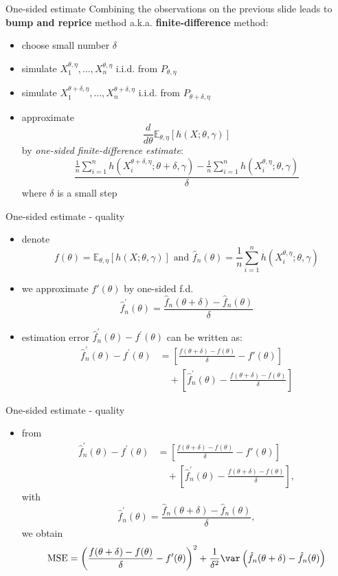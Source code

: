 \documentclass[pdf, handout]{beamer}
\begin{document}
\begin{frame}{One-sided estimate}
Combining the observations on the previous slide leads to
\textbf{bump and reprice} method a.k.a.
\textbf{finite-difference} method:
\begin{itemize}
\item choose small number $\delta$
\item simulate $X_1^{\theta,\eta},\dots,X_n^{\theta,\eta}$ i.i.d. from
$P_{\theta,\eta}$
\item simulate $X_1^{\theta+\delta,\eta},\dots,X_n^{\theta+\delta,\eta}$ i.i.d. from
$P_{\theta+\delta,\eta}$
\item approximate
\[
\frac{d}{d\theta} \mathbb{E}_{\theta,\eta} [ h(X; \theta, \gamma)]
\]
by \emph{one-sided finite-difference estimate}:
$$
\frac{\frac{1}{n}\sum_{i=1}^n h(X_i^{\theta+\delta,\eta}; \theta+\delta,\gamma) - \frac{1}{n}\sum_{i=1}^n h(X_i^{\theta,\eta}; \theta,\gamma)}{\delta}
$$
where $\delta$ is a small step
\end{itemize}
\end{frame}

\begin{frame}{One-sided estimate - quality}
\begin{itemize}
\item denote 
\[
f(\theta) = \mathbb{E}_{\theta,\eta} [ h(X; \theta, \gamma)] \text{ and } 
\hat f_n(\theta) = \frac{1}{n}\sum_{i=1}^n h(X_i^{\theta,\eta}; \theta,\gamma)
\]
\item we approximate $f'(\theta)$ by one-sided f.d.
\[
\hat{f}_n^\prime(\theta) = \frac{ \hat f_n(\theta+\delta) - \hat f_n(\theta)}{\delta}
\]
\item estimation error $\hat{f}_n^\prime(\theta) - f^\prime(\theta)$ can be written as:
\begin{align*}
\hat{f}_n^\prime(\theta) - f^\prime(\theta) &
= \left[
\frac{ f(\theta+\delta) - f(\theta)}{\delta} - f'(\theta)
\right] \\
&\quad + \left[ \hat{f}_n^\prime(\theta) - \frac{ f(\theta+\delta) - f(\theta)}{\delta} \right]
\end{align*}
\end{itemize}
\end{frame}

\begin{frame}{One-sided estimate - quality}
\begin{itemize}
\item from
\begin{align*}
\hat{f}_n^\prime(\theta) - f^\prime(\theta) &
= \left[
\frac{ f(\theta+\delta) - f(\theta)}{\delta} - f'(\theta)
\right] \\
&\quad + \left[ \hat{f}_n^\prime(\theta) - \frac{ f(\theta+\delta) - f(\theta)}{\delta} \right],
\end{align*}
with \[
\hat{f}_n^\prime(\theta) = \frac{ \hat f_n(\theta+\delta) - \hat f_n(\theta)}{\delta},
\]
we obtain
\[
\text{MSE} = \left( \frac{ f(\theta+\delta) - f(\theta)}{\delta} - f'(\theta)
    \right)^2 +
 \frac{1}{\delta^2} \var\left(
    \hat f_n(\theta+\delta) -  \hat f_n(\theta)
    \right)
\]
\end{itemize}
\end{frame}
\end{document}
